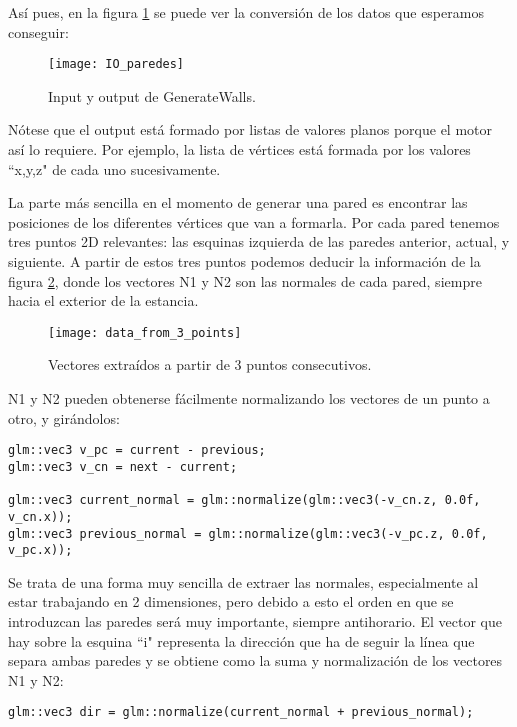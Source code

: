 Así pues, en la figura \ref{fig:io_generatewalls} se puede ver la conversión de los datos que esperamos conseguir:

\begin{figure}[H]
    \centering
    \texttt{[image: IO\_paredes]}
    \caption{Input y output de GenerateWalls.}
    \label{fig:io_generatewalls}
\end{figure}

Nótese que el output está formado por listas de valores planos porque el motor así lo requiere. Por ejemplo, la lista de vértices está formada por los valores ``x,y,z" de cada uno  sucesivamente.

La parte más sencilla en el momento de generar una pared es encontrar las posiciones de los diferentes vértices que van a formarla. Por cada pared tenemos tres puntos 2D relevantes: las esquinas izquierda de las paredes anterior, actual, y siguiente. A partir de estos tres puntos podemos deducir la información de la figura \ref{fig:wall_vectors}, donde los vectores N1 y N2 son las normales de cada pared, siempre hacia el exterior de la estancia. 

\begin{figure}[H]
    \centering
    \texttt{[image: data\_from\_3\_points]}
    \caption{Vectores extraídos a partir de 3 puntos consecutivos.}
    \label{fig:wall_vectors}
\end{figure}

N1 y N2 pueden obtenerse fácilmente normalizando los vectores de un punto a otro, y girándolos:

\begin{lstlisting}
glm::vec3 v_pc = current - previous;
glm::vec3 v_cn = next - current;

glm::vec3 current_normal = glm::normalize(glm::vec3(-v_cn.z, 0.0f, v_cn.x));
glm::vec3 previous_normal = glm::normalize(glm::vec3(-v_pc.z, 0.0f, v_pc.x));
\end{lstlisting}

Se trata de una forma muy sencilla de extraer las normales, especialmente al estar trabajando en 2 dimensiones, pero debido a esto el orden en que se introduzcan las paredes será muy importante, siempre antihorario. El vector que hay sobre la esquina ``i" representa la dirección que ha de seguir la línea que separa ambas paredes y se obtiene como la suma y normalización de los vectores N1 y N2:

\begin{lstlisting}
glm::vec3 dir = glm::normalize(current_normal + previous_normal);
\end{lstlisting}

